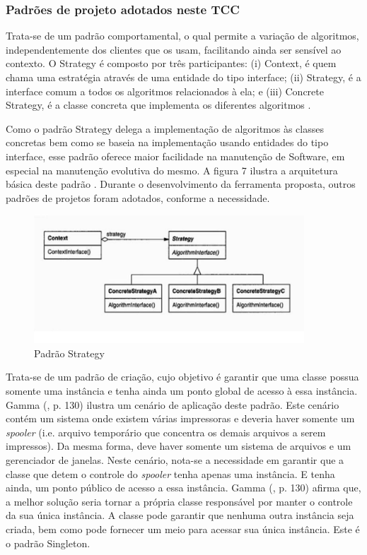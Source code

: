 \subsubsection{Padrões de projeto adotados neste TCC}


Trata-se de um padrão comportamental, o qual permite a variação de algoritmos, independentemente dos clientes que os usam, facilitando ainda ser sensível ao contexto. O Strategy é composto por três participantes: (i) Context, é quem chama uma estratégia através de uma entidade do tipo interface; (ii) Strategy, é a interface comum a todos os algoritmos relacionados à ela; e (iii) Concrete Strategy, é a classe concreta que implementa os diferentes algoritmos \cite[p.294]{gamma2000}. 

Como o padrão Strategy delega a implementação de algoritmos às classes concretas bem como se baseia na implementação usando entidades do tipo interface, esse padrão oferece maior facilidade na manutenção de Software, em especial na manutenção evolutiva do mesmo. A figura 7  ilustra a arquitetura básica deste padrão \cite[p.295]{gamma2000}. Durante o desenvolvimento da ferramenta proposta, outros padrões de projetos foram adotados, conforme a necessidade.

\begin{figure}[h]
\centering
\label{f07}
\includegraphics[width=0.9\textwidth]{figuras/f07}
\caption{Padrão Strategy}
\end{figure}

Trata-se de um padrão de criação, cujo objetivo é garantir que uma classe possua somente uma instância e tenha ainda um ponto global de acesso à essa instância. Gamma (\citeyear{gamma2000}, p. 130) ilustra um cenário de aplicação deste padrão. Este cenário contém um sistema onde existem várias impressoras e deveria haver somente um \textit{spooler} (i.e. arquivo temporário que concentra os demais arquivos a serem impressos). Da mesma forma, deve haver somente um sistema de arquivos e um gerenciador de janelas. Neste cenário, nota-se a necessidade em garantir que a classe que detem o controle do \textit{spooler} tenha apenas uma instância. E tenha ainda, um ponto público de acesso a essa instância. Gamma (\citeyear{gamma2000}, p. 130) afirma que, a melhor solução seria tornar a própria classe responsável por manter o controle da sua única instância. A classe pode garantir que nenhuma outra instância seja criada, bem como pode fornecer um meio para acessar sua única instância. Este é o padrão Singleton.

